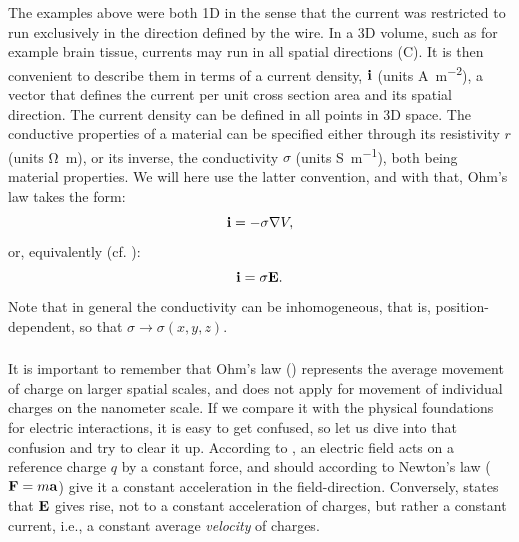 The examples above were both 1D in the sense that the current was restricted to run exclusively in the direction defined by the wire. In a 3D volume, such as for example brain tissue, currents may run in all spatial directions (C). It is then convenient to describe them in terms of a current density, ${\bf i}$ (units \si{\ampere\per\square\metre}), a vector that defines the current per unit cross section area and its spatial direction. The current density can be defined in all points in 3D space. The conductive properties of a material can be specified either through its resistivity $r$ (units \si{\ohm\metre}), or its inverse, the conductivity $\sigma$ (units \si{\siemens\per\metre}), both being material properties. We will here use the latter convention, and with that, Ohm's law takes the form:
\begin{equation}
{\bf i} = - \sigma {\bf \nabla} V,
\label{eq:Basics:Ohm_3D_phi}
\end{equation}
%
or, equivalently (cf. ):
\begin{equation}
{\bf i} = \sigma {\bf E}.
\label{eq:Basics:Ohm_general}
\end{equation}
Note that in general the conductivity can be inhomogeneous, that is, position-dependent, so that $\sigma \rightarrow\sigma(x,y,z)$.

\subsubsection{}
\label{sec:Basics:Note}
It is important to remember that Ohm's law () represents the average movement of charge on larger spatial scales, and does not apply for movement of individual charges on the nanometer scale. If we compare it with the physical foundations for electric interactions, it is easy to get confused, so let us dive into that confusion and try to clear it up. According to , an electric field acts on a reference charge $q$ by a constant force, and should according to Newton's law (${\bf F} = m{\bf a}$) give it a constant acceleration in the field-direction. Conversely,  states that ${\bf E}$ gives rise, not to a constant acceleration of charges, but rather a constant current, i.e., a constant average \textit{velocity} of charges.

